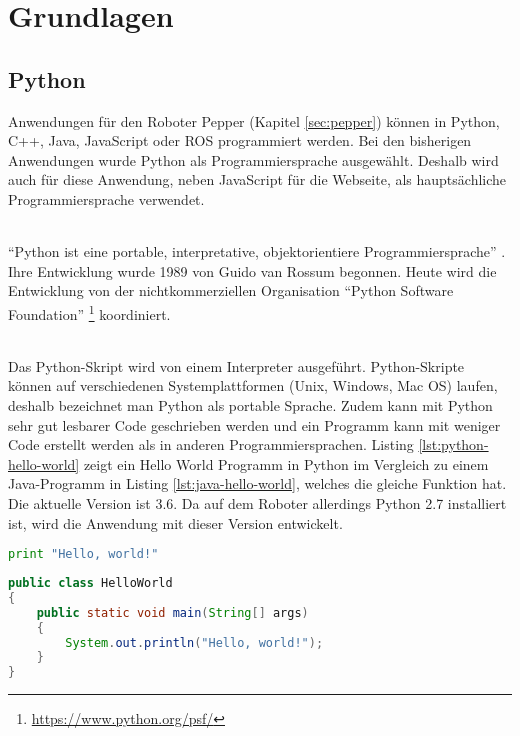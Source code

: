 \chapter{Grundlagen}\label{sec:grundlagen}
\section{Python}\label{sec:python}
Anwendungen für den Roboter Pepper (Kapitel \ref{sec:pepper}) können in Python,
C++, Java, JavaScript oder ROS programmiert werden. \cite{SoftBankIII2018} Bei
den bisherigen Anwendungen wurde Python als Programmiersprache ausgewählt.
Deshalb wird auch für diese Anwendung, neben JavaScript für die Webseite, als
hauptsächliche Programmiersprache verwendet.

\subparagraph{}
 "`Python ist eine portable,
interpretative, objektorientiere Programmiersprache"' \cite{Weigend2017}. Ihre
Entwicklung wurde 1989 von Guido van Rossum begonnen. Heute wird die
Entwicklung von der nichtkommerziellen Organisation "`Python Software Foundation"'
\footnote{\url{https://www.python.org/psf/}} koordiniert.

\subparagraph{}
Das Python-Skript wird von einem Interpreter ausgeführt. Python-Skripte können
auf verschiedenen Systemplattformen (Unix, Windows, Mac OS) laufen, deshalb
bezeichnet man Python als portable Sprache. Zudem kann mit Python sehr gut
lesbarer Code geschrieben werden und ein Programm kann mit weniger Code erstellt
werden als in anderen Programmiersprachen. Listing \ref{lst:python-hello-world}
zeigt ein Hello World Programm in Python im Vergleich zu einem Java-Programm in
Listing \ref{lst:java-hello-world}, welches die gleiche Funktion hat.
Die aktuelle Version ist 3.6.
Da auf dem Roboter allerdings Python 2.7 installiert ist, wird die Anwendung mit dieser
Version entwickelt. \cite{Weigend2017}

\begin{lstlisting}[float, language=Python, frame=single, framexleftmargin=15pt,
style=algoBericht, label={lst:python-hello-world}, captionpos=b, caption={Hello
World in Python}] 
print "Hello, world!"
\end{lstlisting}

\begin{lstlisting}[float, language=Java, frame=single, framexleftmargin=15pt,
style=algoBericht, label={lst:java-hello-world}, captionpos=b, caption={Hello
World in Java}] 
public class HelloWorld
{
	public static void main(String[] args)
	{
		System.out.println("Hello, world!");
	}
}
\end{lstlisting}

